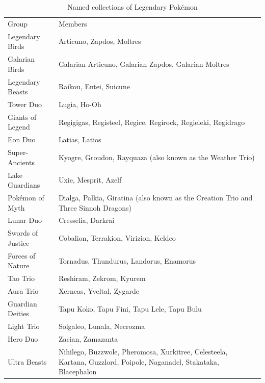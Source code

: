 \begin{table}
\begin{tabular}{lp{}}
Group & Members\\
\Midrule
Legendary Birds & Articuno, Zapdos, Moltres\\
Galarian Birds & Galarian Articuno, Galarian Zapdos, Galarian Moltres\\
Legendary Beasts & Raikou, Entei, Suicune\\
Tower Duo & Lugia, Ho-Oh\\
Giants of Legend & Regigigas, Registeel, Regice, Regirock, Regieleki, Regidrago\\
Eon Duo & Latias, Latios\\
Super-Ancients & Kyogre, Groudon, Rayquaza (also known as the Weather Trio)\\
Lake Guardians & Uxie, Mesprit, Azelf\\
Pokémon of Myth & Dialga, Palkia, Giratina (also known as the Creation Trio and Three Sinnoh Dragons)\\
Lunar Duo & Cresselia, Darkrai\\
Swords of Justice & Cobalion, Terrakion, Virizion, Keldeo\\
Forces of Nature & Tornadus, Thundurus, Landorus, Enamorus\\
Tao Trio & Reshiram, Zekrom, Kyurem\\
Aura Trio & Xerneas, Yveltal, Zygarde\\
Guardian Deities & Tapu Koko, Tapu Fini, Tapu Lele, Tapu Bulu\\
Light Trio & Solgaleo, Lunala, Necrozma\\
Hero Duo & Zacian, Zamazanta\\
Ultra Beasts & Nihilego, Buzzwole, Pheromosa, Xurkitree, Celesteela, Kartana, Guzzlord,
               Poipole, Naganadel, Stakataka, Blacephalon \\
\end{tabular}
\caption{Named collections of Legendary Pokémon\label{table:namedmyths}}
\end{table}

%
